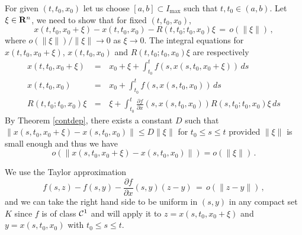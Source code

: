 \documentclass[12pt]{report}
\newcommand{\calC}{{\cal C}}
\newcommand{\bR}{{\bf R}}
\newcommand{\proof}{\noindent {\em Proof:~}}
\newcommand{\nn}{\nonumber}
\def\to{\rightarrow}
\begin{document}
\proof For given $(t,t_0,x_0)$ let us choose $[a,b] \subset I_{\max}$
such that $t,t_0 \in (a,b)$.  Let $\xi \in \bR^n$, we need to show
that for fixed $(t,t_0,x_0)$, 
\begin{equation}
x(t,t_0,x_0+\xi) - x(t,t_0,x_0) - R(t,t_0;t_0,x_0)\xi \,=\, 
o(\|\xi\|)\,,
\end{equation}
where $o(\|\xi\|)/\|\xi\| \to 0$ as $\xi \to 0$. 
The integral equations for 
$x(t,t_0,x_0+\xi)$, $x(t,t_0,x_0)$ and $R(t,t_0;t_0,x_0)\xi$ 
are respectively 
\begin{eqnarray}
x(t,t_0,x_0+\xi)\,&=&\, x_0 +\xi + \int_{t_0}^t
f(s,x(s,t_0,x_0+\xi))\, ds \nn \\ x(t,t_0,x_0)
\,&=&\, x_0 + \int_{t_0}^t f(s,x(s,t_0,x_0))\, ds \nn \\ 
R(t,t_0;t_0,x_0)\xi \,&=&\, \xi + \int_{t_0}^t \frac{\partial f}
{\partial x} (s,x(s,t_0,x_0))
R(s,t_0; t_0, x_0)\xi \,ds
\end{eqnarray}
By Theorem \ref{contdep}, there exists a constant $D$ such that 
$\|x(s,t_0,x_0+\xi) - x(s,t_0,x_0)\| \le D \|\xi \|$ for $t_0 \le s \le t$
provided $\|\xi\|$ is small enough and thus  we have 
\begin{equation}
o(\|x(s,t_0,x_0+\xi) - x(s,t_0,x_0)\|) = o( \|\xi\|)\,.
\end{equation}   

We use the Taylor approximation
\begin{equation}
f(s,z)-f(s,y) - \frac{\partial f}{\partial x}(s,y)(z-y) \,=\, o(\|z-y\|) \,,  
\end{equation}
and we can take the right hand side to be uniform in $(s,y)$ in any compact set  
$K$ since $f$ is of class $\calC^1$ and will apply it to  $z= x(s,t_0,x_0+\xi)$ and $y=x(s,t_0,x_0)$ with $t_0\le s\le t$. 
   
\end{document}
